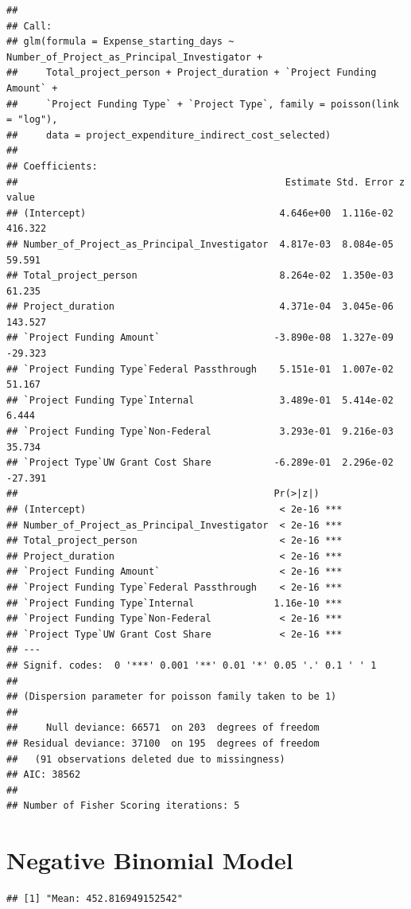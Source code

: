 \documentclass[
]{article}
\begin{document}
\begin{verbatim}
## 
## Call:
## glm(formula = Expense_starting_days ~ Number_of_Project_as_Principal_Investigator + 
##     Total_project_person + Project_duration + `Project Funding Amount` + 
##     `Project Funding Type` + `Project Type`, family = poisson(link = "log"), 
##     data = project_expenditure_indirect_cost_selected)
## 
## Coefficients:
##                                               Estimate Std. Error z value
## (Intercept)                                  4.646e+00  1.116e-02 416.322
## Number_of_Project_as_Principal_Investigator  4.817e-03  8.084e-05  59.591
## Total_project_person                         8.264e-02  1.350e-03  61.235
## Project_duration                             4.371e-04  3.045e-06 143.527
## `Project Funding Amount`                    -3.890e-08  1.327e-09 -29.323
## `Project Funding Type`Federal Passthrough    5.151e-01  1.007e-02  51.167
## `Project Funding Type`Internal               3.489e-01  5.414e-02   6.444
## `Project Funding Type`Non-Federal            3.293e-01  9.216e-03  35.734
## `Project Type`UW Grant Cost Share           -6.289e-01  2.296e-02 -27.391
##                                             Pr(>|z|)    
## (Intercept)                                  < 2e-16 ***
## Number_of_Project_as_Principal_Investigator  < 2e-16 ***
## Total_project_person                         < 2e-16 ***
## Project_duration                             < 2e-16 ***
## `Project Funding Amount`                     < 2e-16 ***
## `Project Funding Type`Federal Passthrough    < 2e-16 ***
## `Project Funding Type`Internal              1.16e-10 ***
## `Project Funding Type`Non-Federal            < 2e-16 ***
## `Project Type`UW Grant Cost Share            < 2e-16 ***
## ---
## Signif. codes:  0 '***' 0.001 '**' 0.01 '*' 0.05 '.' 0.1 ' ' 1
## 
## (Dispersion parameter for poisson family taken to be 1)
## 
##     Null deviance: 66571  on 203  degrees of freedom
## Residual deviance: 37100  on 195  degrees of freedom
##   (91 observations deleted due to missingness)
## AIC: 38562
## 
## Number of Fisher Scoring iterations: 5
\end{verbatim}

\section{Negative Binomial Model}\label{negative-binomial-model}

\begin{verbatim}
## [1] "Mean: 452.816949152542"
\end{verbatim}
\end{document}
